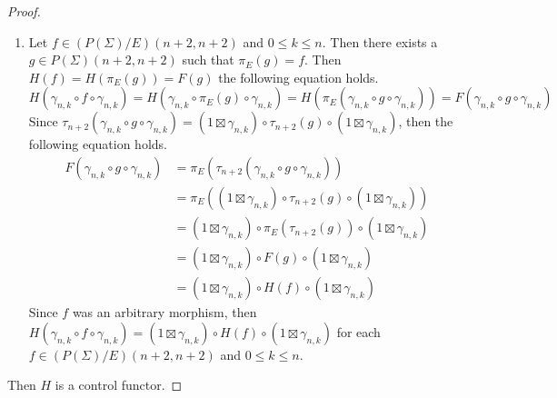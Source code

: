 \begin{proof}
\begin{enumerate}
\begin{align*}
          \end{align*}
          Since $f$ was arbitrary, then $H( H( f ) ) = \overline{\sigma} \circ H( H( f ) ) \circ \overline{\sigma}$ for each $f \in ( P( \Sigma ) / E )( n, n )$.
    \item Let $f \in ( P( \Sigma ) / E )( n + 2, n + 2 )$ and $0 \le k \le n$.
          Then there exists a $g \in P( \Sigma )( n + 2, n + 2 )$ such that $\pi_E( g ) = f$.
          Then $H( f ) = H( \pi_E( g ) ) = F( g )$ the following equation holds.
          \begin{equation*}
              H( \gamma_{n,k} \circ f \circ \gamma_{n,k} )
              =
              H( \gamma_{n,k} \circ \pi_E( g ) \circ \gamma_{n,k} )
              =
              H( \pi_E( \gamma_{n,k} \circ g \circ \gamma_{n,k} ) )
              =
              F( \gamma_{n,k} \circ g \circ \gamma_{n,k} )
          \end{equation*}
          Since $\tau_{n+2}( \gamma_{n,k} \circ g \circ \gamma_{n,k} ) = ( 1 \boxtimes \gamma_{n,k} ) \circ \tau_{n+2}( g ) \circ ( 1 \boxtimes \gamma_{n,k} )$, then the following equation holds.
          \begin{align*}
              F( \gamma_{n,k} \circ g \circ \gamma_{n,k} )
              &=
              \pi_E( \tau_{n+2}( \gamma_{n,k} \circ g \circ \gamma_{n,k} ) )
              \\
              &=
              \pi_E( ( 1 \boxtimes \gamma_{n,k} ) \circ \tau_{n+2}( g ) \circ ( 1 \boxtimes \gamma_{n,k} ) )
              \\
              &= ( 1 \boxtimes \gamma_{n,k} ) \circ \pi_E( \tau_{n+2}( g ) ) \circ ( 1 \boxtimes \gamma_{n,k} )
              \\
              &= ( 1 \boxtimes \gamma_{n,k} ) \circ F( g ) \circ ( 1 \boxtimes \gamma_{n,k} )
              \\
              &= ( 1 \boxtimes \gamma_{n,k} ) \circ H( f ) \circ ( 1 \boxtimes \gamma_{n,k} )
          \end{align*}
          Since $f$ was an arbitrary morphism, then $H( \gamma_{n,k} \circ f \circ \gamma_{n,k} ) = ( 1 \boxtimes \gamma_{n,k} ) \circ H( f ) \circ ( 1 \boxtimes \gamma_{n,k} )$ for each $f \in ( P( \Sigma ) / E )( n + 2, n + 2 )$ and $0 \le k \le n$.
    \end{enumerate}
    Then $H$ is a control functor.
\end{proof}